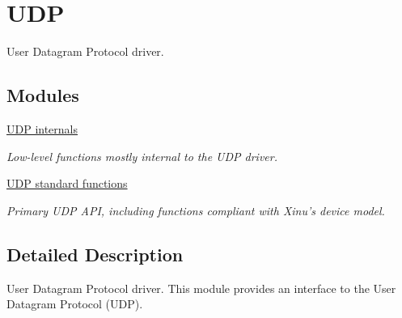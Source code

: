 \hypertarget{group__udp}{\section{U\-D\-P}
\label{group__udp}
}


User Datagram Protocol driver.  


\subsection*{Modules}
\begin{DoxyCompactItemize}
\item 
\hyperlink{group__udpinternal}{U\-D\-P internals}
\begin{DoxyCompactList}\small\item\em Low-\/level functions mostly internal to the U\-D\-P driver. \end{DoxyCompactList}\item 
\hyperlink{group__udpexternal}{U\-D\-P standard functions}
\begin{DoxyCompactList}\small\item\em Primary U\-D\-P A\-P\-I, including functions compliant with Xinu's device model. \end{DoxyCompactList}\end{DoxyCompactItemize}


\subsection{Detailed Description}
User Datagram Protocol driver. This module provides an interface to the User Datagram Protocol (U\-D\-P). 